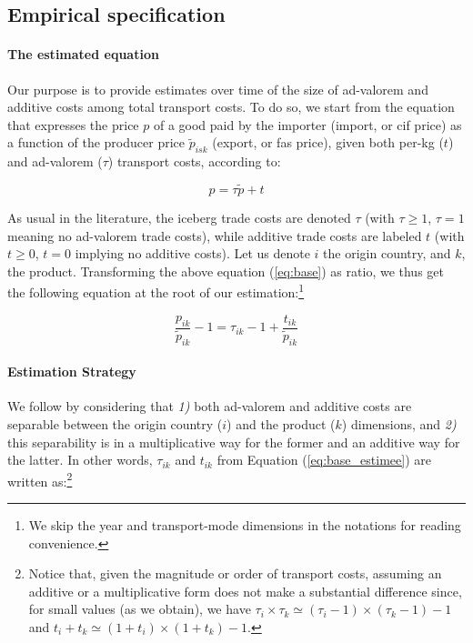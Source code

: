 \documentclass[a4paper,11pt]{article}
\begin{document}
\subsection{Empirical specification}

\paragraph{The estimated equation} Our purpose is to provide estimates over time of the size of ad-valorem and additive costs among total transport costs. To do so, we start from the equation that expresses the price $p$ of a good paid by the importer (import, or cif price) as a function of the producer price $\widetilde{p}_{isk}$ (export, or fas price), given both per-kg ($t$) and ad-valorem ($\tau$) transport costs, according to:

\begin{equation}
p = \tau \widetilde{p}+ t \label{eq:base}
\end{equation}

\noindent As usual in the literature, the iceberg trade costs are denoted $\tau$ (with  $\tau \geq 1$, $\tau=1$ meaning no ad-valorem trade costs), while additive trade costs are labeled $t$ (with $t \geq 0$, $t=0$ implying no additive costs).  Let us denote $i$ the origin country, and $k$, the product. Transforming the above equation (\ref{eq:base}) as ratio, we thus get the following equation at the root of our estimation:\footnote{We skip the year and transport-mode dimensions in the notations for reading convenience.}

\begin{equation}
\frac{p_{ik}}{\widetilde{p}_{ik}} -1 = \tau_{ik} -1 +\frac{t_{ik}}{ \widetilde{p}_{ik}} \label{eq:base_estimee}
\end{equation}

\paragraph{Estimation Strategy} We follow \citet{Irrazabal_2015} by considering that \textit{1)} both ad-valorem and additive costs are separable between the origin country ($i$) and the product ($k$) dimensions, and \textit{2)} this separability is in a multiplicative way for the former and an additive way for the latter. In other words, $\tau_{ik}$ and $t_{ik}$ from Equation (\ref{eq:base_estimee}) are written as:\footnote{Notice that, given the magnitude or order of transport costs, assuming an additive or a multiplicative form does not make a substantial difference since, for small values (as we obtain), we have $\tau_i\times \tau_k \simeq (\tau_i-1)\times (\tau_k -1)-1$ and $t_i+t_k\simeq (1+t_i)\times(1+t_k)-1$.}
\end{document}
